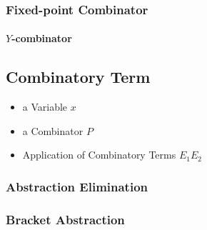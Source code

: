 \subsubsection{Fixed-point Combinator}\label{sec:fixedpoint_combinator}

\paragraph{$Y$-combinator}\label{sec:y_combinator}



\subsection{Combinatory Term}\label{sec:combinatory_term}

\begin{itemize}
  \item a Variable $x$
  \item a Combinator $P$
  \item Application of Combinatory Terms $E_1 E_2$
\end{itemize}



\subsubsection{Abstraction Elimination}
\label{sec:abstraction_elimination}

\subsubsection{Bracket Abstraction}\label{sec:bracket_abstraction}
